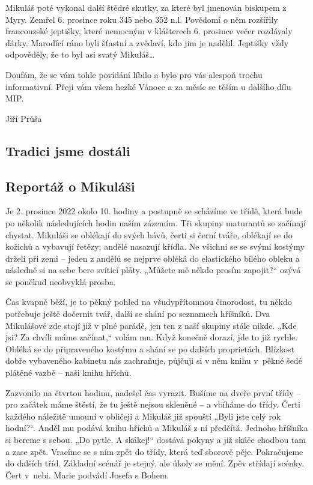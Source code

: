 \documentclass[12pt, a4paper]{article}
\begin{document}
\begin{multicols*}{2}
		Mikuláš poté vykonal další štědré skutky, za které byl
		jmenován biskupem z Myry. Zemřel 6. prosince roku
		345 nebo 352 n.l. Povědomí o něm rozšířily francouzské
		jeptišky, které nemocným v klášterech 6. prosince
		večer rozdávaly dárky. Marodící ráno byli šťastní a
		zvědaví, kdo jim je nadělil. Jeptišky vždy odpověděly, že
		to byl asi svatý Mikuláš\dots

		Doufám, že se vám tohle povídání líbilo a bylo pro vás
		alespoň trochu informativní. Přeji vám všem hezké
		Vánoce a za měsíc se těším u dalšího dílu MIP.
		\begin{flushright}
			\footnotesize Jiří Průša
		\end{flushright}

		\vspace*{-1.5\baselineskip}
		\begin{center}\section*{Tradici jsme dostáli}\end{center}
		\subsection*{\centering Reportáž o Mikuláši}

		Je 2. prosince 2022 okolo 10. hodiny a postupně se scházíme ve třídě, která bude po několik následujících hodin naším zázemím. Tři skupiny maturantů se začínají chystat. Mikuláši se oblékají do svých hávů, čerti si černí tváře, oblékají se do kožichů a vybavují řetězy; andělé nasazují křídla. Ne všichni se se svými kostýmy drželi při zemi – jeden z andělů se nejprve obléká do elastického bílého obleku a následně si na sebe bere svíticí pláty. „Můžete mě někdo prosím zapojit?“ ozývá se poněkud neobvyklá prosba.

		Čas kvapně běží, je to pěkný pohled na všudypřítomnou činorodost, tu někdo potřebuje ještě dočernit tvář, další se shání po seznamech hříšníků. Dva Mikulášové zde stojí již v plné parádě, jen ten z naší skupiny stále nikde. „Kde jsi? Za chvíli máme začínat,“ volám mu. Když konečně dorazí, jde to již rychle. Obléká se do připraveného kostýmu a shání se po dalších proprietách. Blízkost dobře vybaveného kabinetu nás zachraňuje, půjčuji si v něm knihu v~pěkné šedé plátěné vazbě – naši knihu hříchů.

		Zazvonilo na čtvrtou hodinu, nadešel čas vyrazit. Bušíme na dveře první třídy -- pro začátek máme štěstí, že tu ještě nejsou skleněné -- a vbíháme do třídy. Čerti každého náležitě umouní v obličeji a Mikuláš již spouští „Byli jste celý rok hodní?“. Anděl mu podává knihu hříchů a Mikuláš z ní předčítá. Jednoho hříšníka si bereme s sebou. „Do pytle. A skákej!“ dostává pokyny a již skáče chodbou tam a zase zpět. Vracíme se s ním zpět do třídy, která teď sborově pěje. Pokračujeme do dalších tříd. Základní scénář je stejný, ale úkoly se mění. Zpěv střídají scénky. Čert v~nebi. Marie podvádí Josefa s Bohem.


\end{multicols*}
\end{document}
